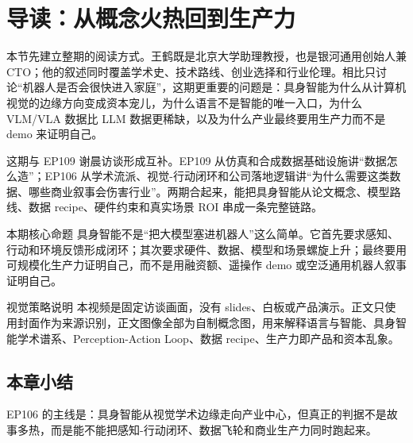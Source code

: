 \section{导读：从概念火热回到生产力}

本节先建立整期的阅读方式。王鹤既是北京大学助理教授，也是银河通用创始人兼 CTO；他的叙述同时覆盖学术史、技术路线、创业选择和行业伦理。相比只讨论“机器人是否会很快进入家庭”，这期更重要的问题是：具身智能为什么从计算机视觉的边缘方向变成资本宠儿，为什么语言不是智能的唯一入口，为什么 VLM/VLA 数据比 LLM 数据更稀缺，以及为什么产业最终要用生产力而不是 demo 来证明自己。

这期与 EP109 谢晨访谈形成互补。EP109 从仿真和合成数据基础设施讲“数据怎么造”；EP106 从学术流派、视觉-行动闭环和公司落地逻辑讲“为什么需要这类数据、哪些商业叙事会伤害行业”。两期合起来，能把具身智能从论文概念、模型路线、数据 recipe、硬件约束和真实场景 ROI 串成一条完整链路。

\begin{importantbox}{本期核心命题}
具身智能不是“把大模型塞进机器人”这么简单。它首先要求感知、行动和环境反馈形成闭环；其次要求硬件、数据、模型和场景螺旋上升；最终要用可规模化生产力证明自己，而不是用融资额、遥操作 demo 或空泛通用机器人叙事证明自己。
\end{importantbox}

\begin{knowledgebox}{视觉策略说明}
本视频是固定访谈画面，没有 slides、白板或产品演示。正文只使用封面作为来源识别，正文图像全部为自制概念图，用来解释语言与智能、具身智能学术谱系、Perception-Action Loop、数据 recipe、生产力即产品和资本乱象。
\end{knowledgebox}

\subsection{本章小结}

EP106 的主线是：具身智能从视觉学术边缘走向产业中心，但真正的判据不是故事多热，而是能不能把感知-行动闭环、数据飞轮和商业生产力同时跑起来。

